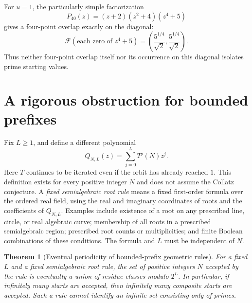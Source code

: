 \documentclass[11pt,a4paper]{article}
\newtheorem{theorem}{Theorem}[section]
\theoremstyle{definition}
\theoremstyle{remark}
\numberwithin{equation}{section}
\begin{document}
For $u=1$, the particularly simple factorization
\[
 P_{40}(z)=(z+2)(z^2+4)(z^4+5)
\]
gives a four-point overlap exactly on the diagonal:
\[
 \mathcal F(\text{each zero of }z^4+5)
 =\left(\frac{5^{1/4}}{\sqrt2},
          \frac{5^{1/4}}{\sqrt2}\right).
\]
Thus neither four-point overlap itself nor its occurrence on this
diagonal isolates prime starting values.

\section{A rigorous obstruction for bounded prefixes}

Fix $L\geq1$, and define a different polynomial
\[
 Q_{N,L}(z)=\sum_{j=0}^{L}T^j(N)z^j.
\]
Here $T$ continues to be iterated even if the orbit has already reached $1$.
This definition exists for every positive integer $N$ and does not assume
the Collatz conjecture.  A \emph{fixed semialgebraic root rule} means a fixed
first-order formula over the ordered real field, using the real and imaginary
coordinates of roots and the coefficients of $Q_{N,L}$.  Examples include
existence of a root on any prescribed line, circle, or real algebraic curve;
membership of all roots in a prescribed semialgebraic region; prescribed root
counts or multiplicities; and finite Boolean combinations of these conditions.
The formula and $L$ must be independent of $N$.

\begin{theorem}[Eventual periodicity of bounded-prefix geometric rules]
For a fixed $L$ and a fixed semialgebraic root rule, the set of positive
integers $N$ accepted by the rule is eventually a union of residue classes
modulo $2^L$.  In particular, if infinitely many starts are accepted, then
infinitely many composite starts are accepted.  Such a rule cannot identify
an infinite set consisting only of primes.
\end{theorem}
\end{document}
